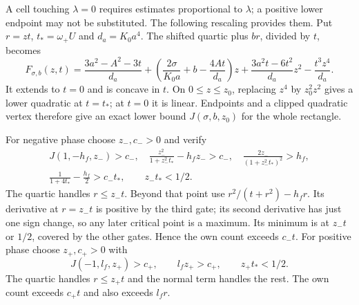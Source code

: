 A cell touching $\lambda=0$ requires estimates proportional to $\lambda$;
a positive lower endpoint may not be substituted. The following rescaling
provides them. Put $r=zt$, $t_*=\omega_+U$ and $d_a=K_0a^4$.
The shifted quartic plus $br$, divided by $t$, becomes
\begin{equation}\label{ms:fourier:cut49:shortloc:scaledown}
 F_{\sigma,b}(z,t)=\frac{3a^2-A^2-3t}{d_a}
 +\left(\frac{2\sigma}{K_0a}+b-\frac{4At}{d_a}\right)z
 +\frac{3a^2t-6t^2}{d_a}z^2-\frac{t^3z^4}{d_a}.
\end{equation}
It extends to $t=0$ and is concave in $t$. On $0\le z\le z_0$, replacing
$z^4$ by $z_0^2z^2$ gives a lower quadratic at $t=t_*$; at $t=0$ it is
linear. Endpoints and a clipped quadratic vertex therefore give an exact
lower bound $J(\sigma,b,z_0)$ for the whole rectangle.

For negative phase choose $z_-,c_->0$ and verify
\begin{gather}\label{ms:fourier:cut49:shortloc:tinynegative}
 J(1,-h_f,z_-)>c_-,\quad
 \frac{z_-^2}{1+z_-^2t_*}-h_fz_->c_-,\quad
 \frac{2z_-}{(1+z_-^2t_*)^2}>h_f,\\
 \frac1{1+4t_*}-\frac{h_f}{2}>c_-t_*,\qquad z_-t_*<1/2.\nonumber
\end{gather}
The quartic handles $r\le z_-t$. Beyond that point use
$r^2/(t+r^2)-h_fr$. Its derivative at $r=z_-t$ is positive by the third
gate; its second derivative has just one sign change, so any later critical
point is a maximum. Its minimum is at $z_-t$ or $1/2$, covered by the other
gates. Hence the own count exceeds $c_-t$.
For positive phase choose $z_+,c_+>0$ with
\begin{equation}\label{ms:fourier:cut49:shortloc:tinypositive}
 J(-1,l_f,z_+)>c_+,\qquad l_fz_+>c_+,\qquad z_+t_*<1/2.
\end{equation}
The quartic handles $r\le z_+t$ and the normal term handles the rest.
The own count exceeds $c_+t$ and also exceeds $l_fr$.

